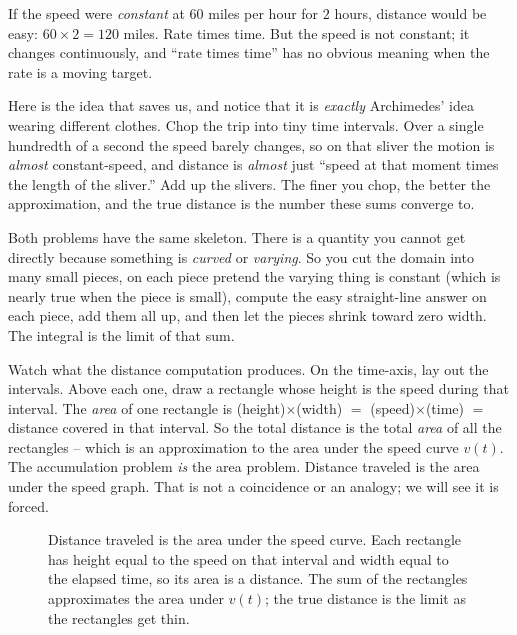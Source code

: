 If the speed were \emph{constant} at $60$ miles per hour for $2$ hours, distance
would be easy: $60 \times 2 = 120$ miles. Rate times time. But the speed is not
constant; it changes continuously, and ``rate times time'' has no obvious
meaning when the rate is a moving target.

Here is the idea that saves us, and notice that it is \emph{exactly} Archimedes'
idea wearing different clothes. Chop the trip into tiny time intervals. Over a
single hundredth of a second the speed barely changes, so on that sliver the
motion is \emph{almost} constant-speed, and distance is \emph{almost} just
``speed at that moment times the length of the sliver.'' Add up the slivers. The
finer you chop, the better the approximation, and the true distance is the
number these sums converge to.

\begin{intuitionbox}
Both problems have the same skeleton. There is a quantity you cannot get
directly because something is \emph{curved} or \emph{varying}. So you cut the
domain into many small pieces, on each piece pretend the varying thing is
constant (which is nearly true when the piece is small), compute the easy
straight-line answer on each piece, add them all up, and then let the pieces
shrink toward zero width. The integral is the limit of that sum.
\end{intuitionbox}

Watch what the distance computation produces. On the time-axis, lay out the
intervals. Above each one, draw a rectangle whose height is the speed during
that interval. The \emph{area} of one rectangle is (height)$\times$(width)
$=$ (speed)$\times$(time) $=$ distance covered in that interval. So the total
distance is the total \emph{area} of all the rectangles -- which is an
approximation to the area under the speed curve $v(t)$. The accumulation problem
\emph{is} the area problem. Distance traveled is the area under the speed graph.
That is not a coincidence or an analogy; we will see it is forced.

\begin{figure}[h]
\centering
{}
\caption{Distance traveled is the area under the speed curve. Each rectangle has
height equal to the speed on that interval and width equal to the elapsed time,
so its area is a distance. The sum of the rectangles approximates the area under
$v(t)$; the true distance is the limit as the rectangles get thin.}
\label{ch20:fig-speed}
\end{figure}

